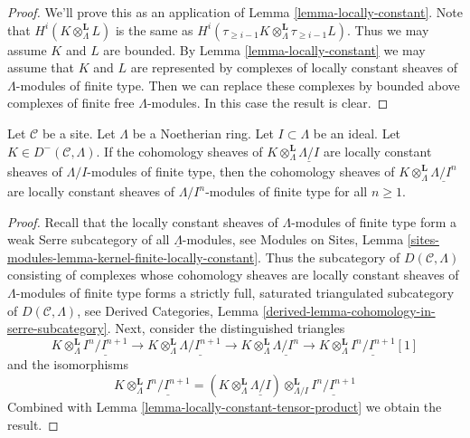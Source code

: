 \begin{proof}
We'll prove this as an application of Lemma \ref{lemma-locally-constant}.
Note that $H^i(K \otimes_\Lambda^\mathbf{L} L)$ is the same as
$H^i(\tau_{\geq i - 1}K \otimes_\Lambda^\mathbf{L} \tau_{\geq i - 1}L)$.
Thus we may assume $K$ and $L$ are bounded. By
Lemma \ref{lemma-locally-constant}
we may assume that $K$ and $L$ are represented by
complexes of locally constant sheaves of $\Lambda$-modules
of finite type. Then we can replace these complexes by
bounded above complexes of finite free $\Lambda$-modules.
In this case the result is clear.
\end{proof}

\begin{lemma}
\label{lemma-locally-constant-bounded}
Let $\mathcal{C}$ be a site. Let $\Lambda$ be a Noetherian ring.
Let $I \subset \Lambda$ be an ideal.
Let $K \in D^-(\mathcal{C}, \Lambda)$. If the cohomology sheaves of
$K \otimes_\Lambda^\mathbf{L} \underline{\Lambda/I}$ are locally constant
sheaves of $\Lambda/I$-modules of finite type, then the cohomology sheaves of
$K \otimes_\Lambda^\mathbf{L} \underline{\Lambda/I^n}$
are locally constant sheaves of $\Lambda/I^n$-modules of finite type for all
$n \geq 1$.
\end{lemma}

\begin{proof}
Recall that the locally constant sheaves of $\Lambda$-modules of finite type
form a weak Serre subcategory of all $\underline{\Lambda}$-modules, see
Modules on Sites, Lemma
\ref{sites-modules-lemma-kernel-finite-locally-constant}.
Thus the subcategory of $D(\mathcal{C}, \Lambda)$ consisting of
complexes whose cohomology sheaves are locally constant sheaves
of $\Lambda$-modules of finite type forms a strictly full, saturated
triangulated subcategory of $D(\mathcal{C}, \Lambda)$, see
Derived Categories, Lemma \ref{derived-lemma-cohomology-in-serre-subcategory}.
Next, consider the distinguished triangles
$$
K \otimes_\Lambda^\mathbf{L} \underline{I^n/I^{n + 1}} \to
K \otimes_\Lambda^\mathbf{L} \underline{\Lambda/I^{n + 1}} \to
K \otimes_\Lambda^\mathbf{L} \underline{\Lambda/I^n} \to
K \otimes_\Lambda^\mathbf{L} \underline{I^n/I^{n + 1}}[1]
$$
and the isomorphisms
$$
K \otimes_\Lambda^\mathbf{L} \underline{I^n/I^{n + 1}}
=
\left(K \otimes_\Lambda^\mathbf{L} \underline{\Lambda/I}\right)
\otimes_{\Lambda/I}^\mathbf{L} \underline{I^n/I^{n + 1}}
$$
Combined with Lemma \ref{lemma-locally-constant-tensor-product}
we obtain the result.
\end{proof}












